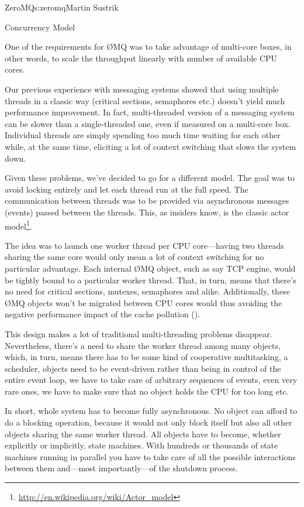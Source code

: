 \begin{aosachapter}{ZeroMQ}{s:zeromq}{Martin Sustrik}
\begin{aosasect1}{Concurrency Model}

One of the requirements for {\O}MQ was to take advantage of multi-core
boxes, in other words, to scale the throughput linearly with number of
available CPU cores.

Our previous experience with messaging systems showed that using
multiple threads in a classic way (critical sections, semaphores etc.)
doesn't yield much performance improvement. In fact, multi-threaded
version of a messaging system can be slower than a single-threaded
one, even if measured on a multi-core box. Individual threads are
simply spending too much time waiting for each other while, at the
same time, eliciting a lot of context switching that slows the system
down.

Given these problems, we've decided to go for a different model. The
goal was to avoid locking entirely and let each thread run at the full
speed. The communication between threads was to be provided via
asynchronous messages (events) passed between the threads. This, as
insiders know, is the classic actor
model\footnote{\url{http://en.wikipedia.org/wiki/Actor\_model}}.

The idea was to launch one worker thread per CPU core---having two
threads sharing the same core would only mean a lot of context
switching for no particular advantage. Each internal {\O}MQ object, such
as say TCP engine, would be tightly bound to a particular worker
thread. That, in turn, means that there's no need for critical
sections, mutexes, semaphores and alike. Additionally, these {\O}MQ
objects won't be migrated between CPU cores would thus avoiding the
negative performance impact of the cache pollution
().


This design makes a lot of traditional multi-threading problems
disappear. Nevertheless, there's a need to share the worker thread
among many objects, which, in turn, means there has to be some kind of
cooperative multitasking, a scheduler, objects need to be event-driven
rather than being in control of the entire event loop, we have to take
care of arbitrary sequences of events, even very rare ones, we have to
make sure that no object holds the CPU for too long etc.

In short, whole system has to become fully asynchronous. No object can
afford to do a blocking operation, because it would not only block
itself but also all other objects sharing the same worker thread. All
objects have to become, whether explicitly or implicitly, state
machines. With hundreds or thousands of state machines running in
parallel you have to take care of all the possible interactions
between them and---most importantly---of the shutdown process.


\end{aosasect1}
\end{aosachapter}
